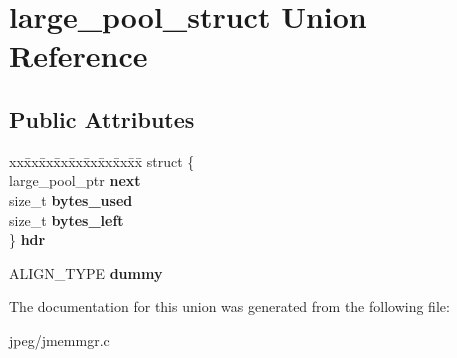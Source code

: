 \hypertarget{unionlarge__pool__struct}{}\section{large\+\_\+pool\+\_\+struct Union Reference}
\label{unionlarge__pool__struct}
\subsection*{Public Attributes}
\begin{DoxyCompactItemize}
\item 
\begin{tabbing}
xx\=xx\=xx\=xx\=xx\=xx\=xx\=xx\=xx\=\kill
struct \{\\
\>large\_pool\_ptr {\bfseries next}\\
\>size\_t {\bfseries bytes\_used}\\
\>size\_t {\bfseries bytes\_left}\\
\} {\bfseries hdr}\hypertarget{unionlarge__pool__struct_a5106d9cd5785093b6e9fc387d3e0927c}{}\label{unionlarge__pool__struct_a5106d9cd5785093b6e9fc387d3e0927c}
\\

\end{tabbing}\item 
A\+L\+I\+G\+N\+\_\+\+T\+Y\+PE {\bfseries dummy}\hypertarget{unionlarge__pool__struct_a850fcb897c7fbfb12dd01193fa0c48aa}{}\label{unionlarge__pool__struct_a850fcb897c7fbfb12dd01193fa0c48aa}

\end{DoxyCompactItemize}


The documentation for this union was generated from the following file\+:\begin{DoxyCompactItemize}
\item 
jpeg/jmemmgr.\+c\end{DoxyCompactItemize}
